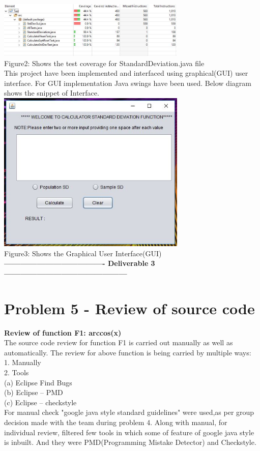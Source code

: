 \documentclass[a4paper,12pt]{article}
\begin{document}
\begin{titlepage}
\newline
\newline
\includegraphics[width=9.0cm]{Coverage.JPG}\\
Figure2: Shows the test coverage for StandardDeviation.java file \\
\newline
This project have been implemented and interfaced using graphical(GUI) user interface. For GUI implementation Java swings have been used. Below diagram shows the snippet of Interface.\\ 
\newline
\includegraphics[width=9.0cm]{GUI.JPG}\\
Figure3: Shows the Graphical User Interface(GUI) \\
\newline
\textbf{-------------------------------------  Deliverable 3   ---------------------------------------------}
\section{Problem 5 - Review of source code}
\textbf{Review of function F1: arccos(x)}\\
The source code review for function F1 is carried out manually as well as automatically. 
The review for  above function is being carried by multiple ways:\\
1.	Manually\\
2.	Tools\\
     (a) Eclipse Find Bugs\\
     (b) Eclipse – PMD\\
     (c) Eclipse – checkstyle\\
\newline
For manual check "google java style standard guidelines" were used,as per group decision made with the team during problem 4. Along with manual, for individual review, filtered few tools in which some of feature of google java style is inbuilt. And they were PMD(Programming Mistake Detector) and Checkstyle. \\
\newline

\end{titlepage}
\end{document}
